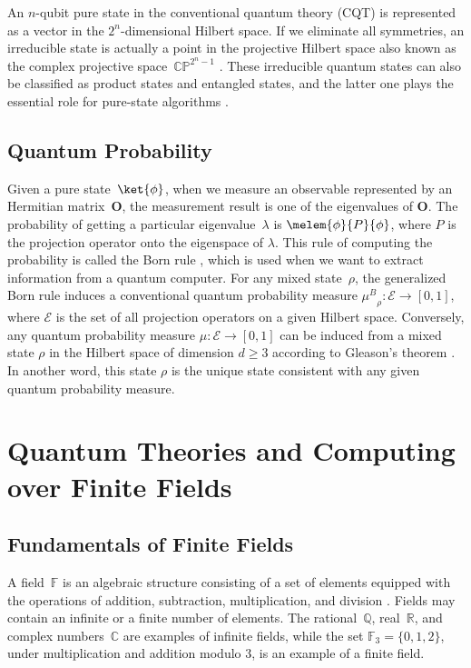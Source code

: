 \documentclass[twoside]{iuphd}
\newcommand{\muB}{\ensuremath{\mu^{B}}}
\newcommand{\events}{\ensuremath{\mathcal{E}}}
\begin{document}
An $n$-qubit pure state in the conventional quantum theory (CQT)
is represented as a vector in the $2^{n}$-dimensional Hilbert space.
If we eliminate all symmetries, an irreducible state is actually a
point in the projective Hilbert space \cite{MosseriDandoloff2001,Jaeger2007}
also known as the complex projective space~$\mathbb{CP}^{2^{n}-1}$
\cite{Hatcher2001,Bengtsson2007}. These irreducible quantum states
can also be classified as product states and entangled states, and
the latter one plays the essential role for pure-state algorithms
\cite{Mermin2007,Jaeger2007}.

\section{Quantum Probability}

Given a pure state~$\ket{\phi}$, when we measure an observable represented
by an Hermitian matrix~$\mathbf{O}$, the measurement result is one
of the eigenvalues of $\mathbf{O}$. The probability of getting a
particular eigenvalue~$\lambda$ is $\melem{\phi}{P}{\phi}$, where
$P$ is the projection operator onto the eigenspace of $\lambda$.
This rule of computing the probability is called the Born rule \cite{Born1983,Mermin2007,Jaeger2007},
which is used when we want to extract information from a quantum computer.
For any mixed state~$\rho$, the generalized Born rule induces a
conventional quantum probability measure $\muB_{\rho}:\events\rightarrow[0,1]$,
where $\events$ is the set of all projection operators on a given
Hilbert space. Conversely, any quantum probability measure $\mu:\events\rightarrow[0,1]$
can be induced from a mixed state $\rho$ in the Hilbert space of
dimension $d\ge3$ according to Gleason's theorem \cite{gleason1957,Redhead1987-REDINA,peres1995quantum,RichmanBridges1999,Hamhalter2013}.
In another word, this state $\rho$ is the unique state consistent
with any given quantum probability measure.

\chapter{Quantum Theories and Computing over Finite Fields}

\section{Fundamentals of Finite Fields\label{sec:background}}

A field~$\mathbb{F}$ is an algebraic structure consisting of a set
of elements equipped with the operations of addition, subtraction,
multiplication, and division \cite{fieldtheory.ref,numtheory.ref}.
Fields may contain an infinite or a finite number of elements. The
rational~$\mathbb{Q}$, real~$\mathbb{R}$, and complex numbers~$\mathbb{C}$
are examples of infinite fields, while the set $\mathbb{F}_{3}=\{0,1,2\}$,
under multiplication and addition modulo $3$, is an example of a
finite field.
\end{document}
